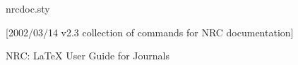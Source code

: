 \begin{filecontents}{nrcdoc.sty}

[2002/03/14 v2.3 collection of commands for
                                    NRC documentation]
%
\newcommand\checkNRCDOCdate[1]{\@ifl@ter{sty}{nrcdoc}{#1}%
  {}%
  {\ClassWarningNoLine{nrcdoc}{An old version of nrcdoc.sty has been detected%
                         \MessageBreak %
                         Please *delete* nrcdoc.sty, to allow LaTeX to
                         \MessageBreak generate a new version}}%
}

%
%
%
\providecommand{\Status}{0}
\ifcase\Status
  \def\href#1#2{#2}
\or
  \RequirePackage[pdftex]{hyperref}
\fi

\RequirePackage{url}
\newcommand{\email}{\begingroup \urlstyle{tt}\Url}
%
\def\EmailURL#1{\href{mailto:#1}{\email{#1}}}
\def\ctanaddr#1{\href{ftp://ctan.tug.org/tex-archive/#1}{\path{#1}}}


\def\ps@myheadings{\let\@mkboth\@gobbletwo
                   \def\@oddhead{{\sl\rightmark}\hfil \rm\thepage}%
                   \def\@oddfoot{Nov. 2002\hfill}%
                   \def\@evenhead{\rm \thepage\hfil\sl\leftmark}%
                   \def\@evenfoot{Oct. 2002\hfill}%
                   \def\sectionmark##1{}\def\subsectionmark##1{}}

\pagestyle{myheadings}

         {{\rm NRC:} \LaTeX{} User Guide for Journals}



\setlength{\textwidth}{19cm}
\setlength{\textheight}{24cm}
\setlength{\oddsidemargin}{-3.5pc}
\setlength{\evensidemargin}{-3.5pc}
\setlength{\headsep}{12pt}
\setlength{\topmargin}{-3.5pc}
\setlength{\columnsep}{1.5pc}



\end{filecontents}
